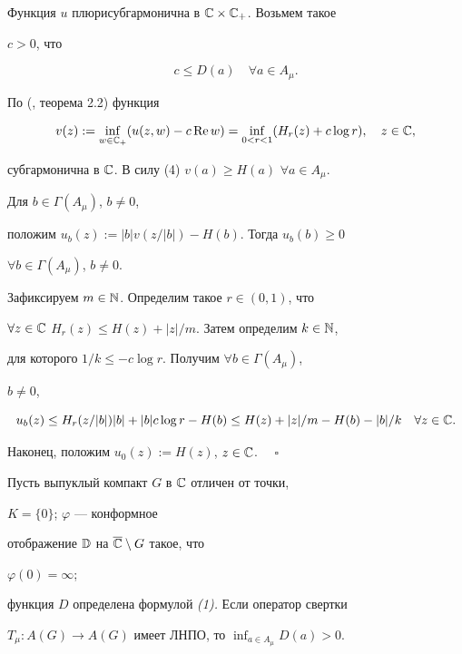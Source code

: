 Функция $u$ плюрисубгармонична в $\Bbb C\times\Bbb C_+$. Возьмем такое 


$c>0$, что 


\begin{equation} 


c\le D(a)\quad\forall a\in A_\mu. 


\end{equation} 


По (\cite{Kis}, теорема 2.2) функция 


$$ 


v(z):=\inf_{w\in\Bbb C_+}(u(z,w)-c\R w)= 


\inf_{0<r<1}(H_r(z)+c\log r),\quad z\in\Bbb C, 


$$ 


субгармонична в $\Bbb C$. В силу (4) $v(a)\ge H(a)$ $\forall a\in A_\mu$. 


Для $b\in\Gamma(A_\mu)$, $b\ne 0$,


положим $u_b(z):=|b|v(z/|b|)-H(b)$. Тогда $u_b(b)\ge 0$ 


$\forall b\in\Gamma(A_\mu)$, $b\ne 0$. 


 


Зафиксируем $m\in\Bbb N$. Определим такое $r\in(0,1)$, что 


$\forall z\in\Bbb C$ $H_r(z)\le H(z)+|z|/m$. Затем определим $k\in\Bbb N$, 


для которого $1/k\le -c\log r$. Получим $\forall b\in\Gamma(A_\mu)$, 


$b\ne 0$,


$$ 


u_b(z)\le H_r(z/|b|)|b|+|b|c\log r-H(b)\le 


H(z)+|z|/m-H(b)-|b|/k\quad \forall z\in\Bbb C. 


$$ 


Наконец, положим $u_0(z):=H(z)$, $z\in\Bbb C$. $\quad\square$


\medskip


 


\begin{lem} Пусть выпуклый компакт $G$ в $\Bbb C$ отличен от точки, 


$K=\{0\}$; $\varphi$ --- конформное 


отображение $\Bbb D$ на $\overline{\Bbb C}\setminus G$ такое, что 


$\varphi(0)=\infty$; 


функция $D$ определена формулой {\em (1).} Если оператор свертки 


$T_\mu :A(G)\to A(G)$ имеет ЛНПО, то $\inf_{a\in A_\mu}D(a)>0$. 


\end{lem} 


